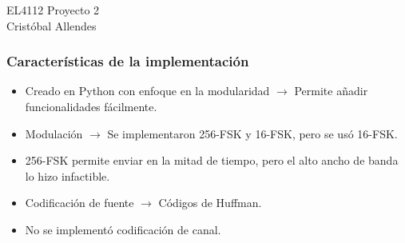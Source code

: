 \documentclass[aspectratio=169]{beamer}
\begin{document}

\begin{frame}

\LARGE EL4112 Proyecto 2 \\
\large Cristóbal Allendes


\end{frame}


\begin{frame}

\frametitle{Características de la implementación}

\begin{itemize}
	\item Creado en Python con enfoque en la modularidad $\rightarrow$ Permite añadir funcionalidades fácilmente.
	\item Modulación $\rightarrow$ Se implementaron 256-FSK y 16-FSK, pero
	se usó 16-FSK.
	\item 256-FSK permite enviar en la mitad de tiempo, pero el alto ancho
	de banda lo hizo infactible.
	\item Codificación de fuente $\rightarrow$ Códigos de Huffman.
	\item No se implementó codificación de canal.
\end{itemize}

\end{frame}

\end{document}
